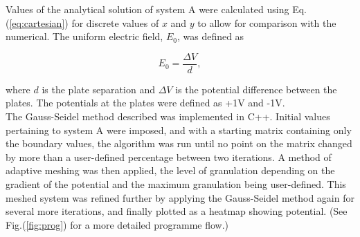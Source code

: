 \documentclass[a4paper]{jpconf}
\begin{document}
Values of the analytical solution of system A were calculated using Eq.(\ref{eq:cartesian}) for discrete values of $x$ and $y$ to allow for comparison with the numerical. The uniform electric field, $E_0$, was defined as

\begin{equation}
	E_0 = \frac{\Delta V}{d},
\end{equation} 

\noindent where $d$ is the plate separation and $\Delta V$ is the potential difference between the plates. The potentials at the plates were defined as +1V and -1V. \\

%

The Gauss-Seidel method described was implemented in C++. Initial values pertaining to system A were imposed, and with a starting matrix containing only the boundary values, the algorithm was run until no point on the matrix changed by more than a user-defined percentage between two iterations. A method of adaptive meshing was then applied, the level of granulation depending on the gradient of the potential and the maximum granulation being user-defined. This meshed system was refined further by applying the Gauss-Seidel method again for several more iterations, and finally plotted as a heatmap showing potential. (See Fig.(\ref{fig:prog}) for a more detailed programme flow.) \\ \\ \\ \\ \\ \\
\end{document}
